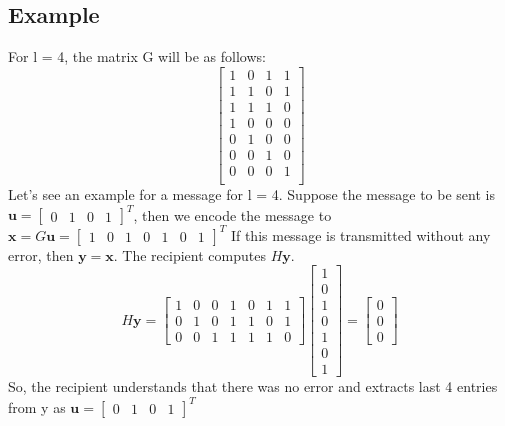 \documentclass[11pt,a4paper]{article}
\begin{document}
\subsection{Example}
For l = 4, the matrix G will be as follows:
$$
\begin{bmatrix}
    1 & 0 & 1 & 1\\
    1 & 1 & 0 & 1\\
    1 & 1 & 1 & 0\\
    1 & 0 & 0 & 0\\
    0 & 1 & 0 & 0\\
    0 & 0 & 1 & 0\\
    0 & 0 & 0 & 1\\
\end{bmatrix}
$$
Let's see an example for a message for l = 4. Suppose the message to be sent is $\mathbf{u} = \begin{bmatrix}
    0 & 1 & 0 & 1
\end{bmatrix}^T$, then we encode the message to $\mathbf{x} = G\mathbf{u} = \begin{bmatrix}
    1 & 0 & 1 & 0 & 1 & 0 & 1
\end{bmatrix}^T$
If this message is transmitted without any error, then $\mathbf{y} = \mathbf{x}$. The recipient computes $H\mathbf{y}$.
$$
H\mathbf{y} = 
\begin{bmatrix}
    1 & 0 & 0 & 1 & 0 & 1 & 1\\
    0 & 1 & 0 & 1 & 1 & 0 & 1\\
    0 & 0 & 1 & 1 & 1 & 1 & 0
\end{bmatrix}
\begin{bmatrix}
    1\\
    0\\
    1\\
    0\\
    1\\
    0\\
    1
\end{bmatrix}
=
\begin{bmatrix}
    0\\
    0\\
    0
\end{bmatrix}
$$
So, the recipient understands that there was no error and extracts last 4 entries from y as $\mathbf{u} = \begin{bmatrix}
    0 & 1 & 0 & 1
\end{bmatrix}^T$
\end{document}
